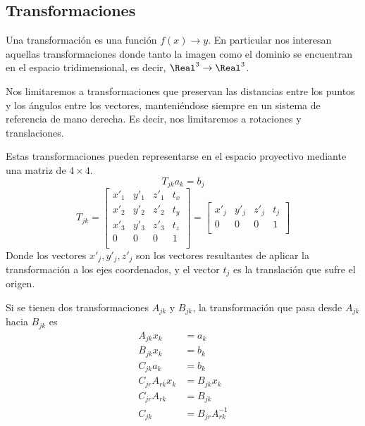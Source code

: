 \subsection{Transformaciones}
Una transformación es una función $f(x) \rightarrow y$.
En particular nos interesan aquellas transformaciones donde
tanto la imagen como el dominio se encuentran en el espacio tridimensional, es decir, $\Real^3 \rightarrow \Real^3$.

Nos limitaremos a transformaciones que preservan las distancias entre los puntos
y los ángulos entre los vectores, manteniéndose siempre en un
sistema de referencia de mano derecha.
Es decir, nos limitaremos a rotaciones y translaciones.

Estas transformaciones pueden representarse en el espacio proyectivo mediante una matriz de $4\times4$.
\[ T_{jk} a_k = b_j \]
\[
	T_{jk} = \left[\begin{matrix}
		x'_1 & y'_1 & z'_1 & t_x \\
		x'_2 & y'_2 & z'_2 & t_y \\
		x'_3 & y'_3 & z'_3 & t_z \\
		0   &  0  &  0  &  1  \\
	\end{matrix}\right] =
	\left[
		\begin{matrix}
			x'_j & y'_j & z'_j & t_j \\
			0 & 0 & 0 & 1 \\
		\end{matrix}
	\right]
\]
Donde los vectores $x'_j, y'_j, z'_j$ son los vectores resultantes de aplicar la transformación a los ejes coordenados,
y el vector $t_j$ es la translación que sufre el origen.

Si se tienen dos transformaciones $A_{jk}$ y $B_{jk}$, la transformación que pasa desde $A_{jk}$ hacia $B_{jk}$ es
\begin{align*}
	A_{jk} x_k &= a_k \\
	B_{jk} x_k &= b_k \\
	C_{jk} a_k &= b_k \\
%
	C_{jr} A_{rk} x_k &= B_{jk} x_k \\
%
	C_{jr} A_{rk} &= B_{jk} \\
	C_{jk} &= B_{jr} A^{-1}_{rk}
\end{align*}


\endinput

Transformación rígida

Matrix transformación lineal $3\times3$

